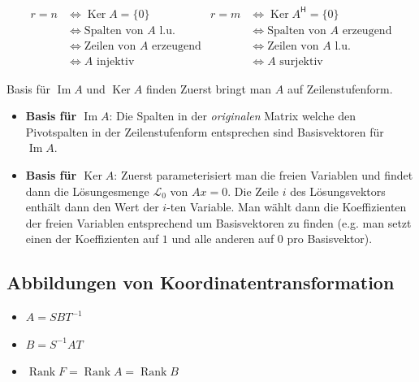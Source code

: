 \documentclass[a4paper,10pt]{article}
\DeclareMathOperator{\Rank}{Rank}
\DeclareMathOperator{\Image}{Im}
\DeclareMathOperator{\Kernel}{Ker}
\newcommand*{\hermconj}{\mathsf{H}}
\def\E{\mathbb{E}}
\begin{document}
\begin{align*}
  r = n & \Leftrightarrow \Kernel A = \{ 0 \} & r = m & \Leftrightarrow \Kernel A^\hermconj = \{ 0 \} \\
  & \Leftrightarrow \text{Spalten von $A$ l.u.} & & \Leftrightarrow \text{Spalten von $A$ erzeugend}\\
  & \Leftrightarrow \text{Zeilen von $A$ erzeugend} & & \Leftrightarrow \text{Zeilen von $A$ l.u.}\\
  & \Leftrightarrow A \text{ injektiv} & & \Leftrightarrow A \text{ surjektiv}
\end{align*}

\begin{subbox}{Basis für $\Image A$ und $\Kernel A$ finden}
  Zuerst bringt man $A$ auf Zeilenstufenform.
  \begin{itemize}
    \item \textbf{Basis für $\Image A$}: Die Spalten in der \textit{originalen} Matrix welche den Pivotspalten in der Zeilenstufenform entsprechen sind Basisvektoren für $\Image A$.
    \item \textbf{Basis für $\Kernel A$}: Zuerst parameterisiert man die freien Variablen und findet dann die Lösungesmenge $\mathcal{L}_0$ von $Ax = 0$. Die Zeile $i$ des Lösungsvektors enthält dann den Wert der $i$-ten Variable. Man wählt dann die Koeffizienten der freien Variablen entsprechend um Basisvektoren zu finden (e.g. man setzt einen der Koeffizienten auf $1$ und alle anderen auf $0$ pro Basisvektor). 
  \end{itemize}
\end{subbox}

\subsection{Abbildungen von Koordinatentransformation}

\begin{subbox}{}
  \begin{multicols}{2}
    \begin{itemize}
      \item $A = SBT^{-1}$
      \item $B = S^{-1}AT$
      \item $\Rank F = \Rank A = \Rank B$
    \end{itemize}
  \end{multicols}
\end{subbox}
\end{document}
